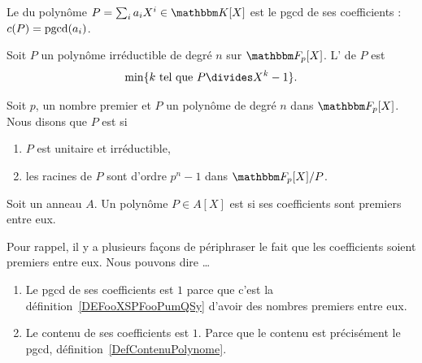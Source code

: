 \begin{definition}\label{DefContenuPolynome}
    Le  du polynôme \( P=\sum_ia_iX^i\in\eK[X]\) est le pgcd de ses coefficients : $c(P)=\operatorname{pgcd}(a_i)$.
\end{definition}

\begin{definition}
    Soit \( P\) un polynôme irréductible de degré \( n\) sur \( \eF_p[X]\). L' de \( P\) est
    \begin{equation}
        \min\{ k\tq P\divides X^k-1 \}.
    \end{equation}
\end{definition}

\begin{definition}           \label{DEFooDVOOooKaPZQC}
    Soit \( p\), un nombre premier et \( P\) un polynôme de degré $n$ dans \( \eF_p[X]\). Nous disons que \( P\) est  si
    \begin{enumerate}
        \item
            \( P\) est unitaire et irréductible,
        \item
            les racines de \( P\) sont d'ordre \( p^n-1\) dans \( \eF_p[X]/P\).
    \end{enumerate}
\end{definition}

\begin{definition}       \label{DEFooAIYGooRAEfHU}
    Soit un anneau \( A\). Un polynôme \( P\in A[X]\) est  si ses coefficients sont premiers entre eux.
\end{definition}

\begin{normaltext}
    Pour rappel, il y a plusieurs façons de périphraser le fait que les coefficients soient premiers entre eux. Nous pouvons dire \ldots
    \begin{enumerate}
        \item
            Le pgcd de ses coefficients est \( 1\) parce que c'est la définition~\ref{DEFooXSPFooPumQSy} d'avoir des nombres premiers entre eux.
        \item
            Le contenu de ses coefficients est \( 1\). Parce que le contenu est précisément le pgcd, définition~\ref{DefContenuPolynome}.
    \end{enumerate}
\end{normaltext}

